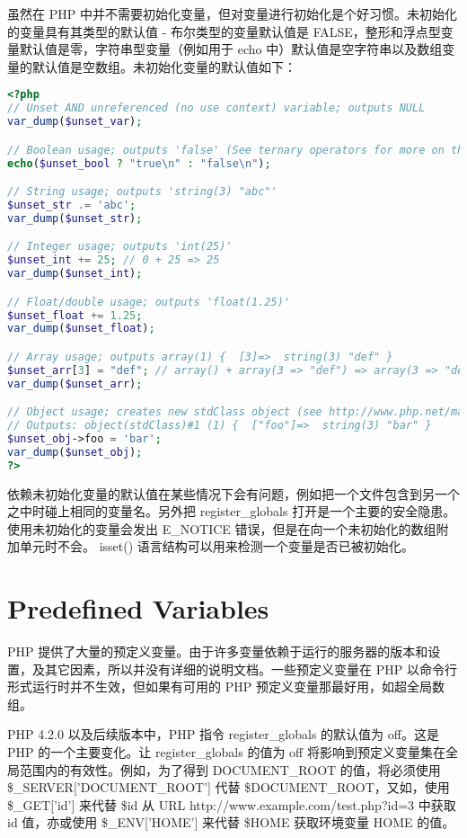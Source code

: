 虽然在 PHP 中并不需要初始化变量，但对变量进行初始化是个好习惯。未初始化的变量具有其类型的默认值 - 布尔类型的变量默认值是 FALSE，整形和浮点型变量默认值是零，字符串型变量（例如用于 echo 中）默认值是空字符串以及数组变量的默认值是空数组。未初始化变量的默认值如下：


\begin{lstlisting}[language=PHP]
<?php
// Unset AND unreferenced (no use context) variable; outputs NULL
var_dump($unset_var);

// Boolean usage; outputs 'false' (See ternary operators for more on this syntax)
echo($unset_bool ? "true\n" : "false\n");

// String usage; outputs 'string(3) "abc"'
$unset_str .= 'abc';
var_dump($unset_str);

// Integer usage; outputs 'int(25)'
$unset_int += 25; // 0 + 25 => 25
var_dump($unset_int);

// Float/double usage; outputs 'float(1.25)'
$unset_float += 1.25;
var_dump($unset_float);

// Array usage; outputs array(1) {  [3]=>  string(3) "def" }
$unset_arr[3] = "def"; // array() + array(3 => "def") => array(3 => "def")
var_dump($unset_arr);

// Object usage; creates new stdClass object (see http://www.php.net/manual/en/reserved.classes.php)
// Outputs: object(stdClass)#1 (1) {  ["foo"]=>  string(3) "bar" }
$unset_obj->foo = 'bar';
var_dump($unset_obj);
?>
\end{lstlisting}

依赖未初始化变量的默认值在某些情况下会有问题，例如把一个文件包含到另一个之中时碰上相同的变量名。另外把 register\_globals 打开是一个主要的安全隐患。使用未初始化的变量会发出 E\_NOTICE 错误，但是在向一个未初始化的数组附加单元时不会。 isset() 语言结构可以用来检测一个变量是否已被初始化。



\section{Predefined Variables}


PHP 提供了大量的预定义变量。由于许多变量依赖于运行的服务器的版本和设置，及其它因素，所以并没有详细的说明文档。一些预定义变量在 PHP 以命令行形式运行时并不生效，但如果有可用的 PHP 预定义变量那最好用，如超全局数组。

PHP 4.2.0 以及后续版本中，PHP 指令 register\_globals 的默认值为 off。这是 PHP 的一个主要变化。让 register\_globals 的值为 off 将影响到预定义变量集在全局范围内的有效性。例如，为了得到 DOCUMENT\_ROOT 的值，将必须使用 \$\_SERVER['DOCUMENT\_ROOT'] 代替 \$DOCUMENT\_ROOT，又如，使用 \$\_GET['id'] 来代替 \$id 从 URL http://www.example.com/test.php?id=3 中获取 id 值，亦或使用 \$\_ENV['HOME'] 来代替 \$HOME 获取环境变量 HOME 的值。

